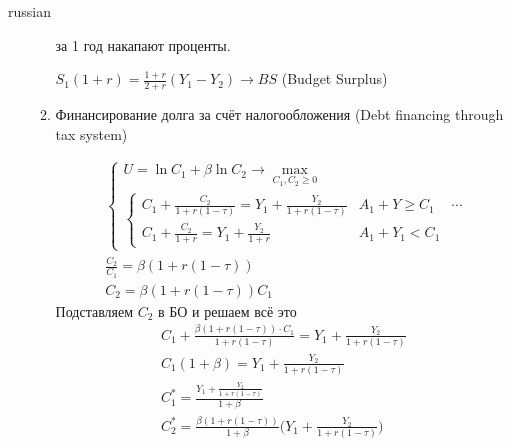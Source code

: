 \documentclass{article}
\begin{document}
\begin{otherlanguage*}{russian}
\begin{enumerate}
\begin{enumerate}
за 1 год накапают проценты. 

$ S_1 (1 + r) = \frac{1 + r }{2 + r} (Y_1 - Y_2) \rightarrow BS$ (Budget Surplus) 

\item Финансирование долга за счёт налогообложения (Debt financing through tax system)

\begin{align}
\begin{cases} 
U = \ln C_1 + \beta \ln C_2 \rightarrow \max_{C_1, C_2 \ge 0 } \\ 
\begin{cases}
C_1 + \frac{C_2}{1 + r(1 - \tau)} = Y_1 + \frac{Y_2}{1 + r (1 - \tau)} & A_1 + Y \ge C_1 \\
C_1 + \frac{C_2}{1 + r} = Y_1 + \frac{Y_2}{1 + r} & A_1 + Y_1 < C_1 
\end{cases}
\end{cases}
\cdots \\
\frac{C_2}{C_1} = \beta (1 + r (1 - \tau)) \\ 
C_2 = \beta (1 + r (1 - \tau )) C_1 
\end{align}
Подставляем $ C_2 $ в БО и решаем всё это
\begin{align}
C_1 + \frac{\beta (1 + r (1 - \tau) ) \cdot C_1}{1 + r (1 - \tau)} = Y_1 + \frac{Y_2}{1 + r (1 - \tau)} \\
C_1 (1 + \beta) = Y_1  + \frac{Y_2}{1 + r  (1 - \tau)} \\
C_1^* = \frac{Y_1 + \frac{Y_2}{1 + r (1 - \tau)}}{1 + \beta} \\
C^*_2 = \frac{\beta (1 + r (1 - \tau))}{1 + \beta} \Big( Y_1 + \frac{Y_2}{1 + r (1 - \tau)}\Big)
\end{align} 
\end{enumerate}
\end{enumerate}
\end{otherlanguage*} 
\end{document}
